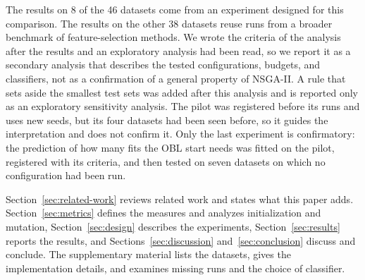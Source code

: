 The results on 8 of the 46 datasets come from an experiment designed for this comparison. The results on the other 38 datasets reuse runs from a broader benchmark of feature-selection methods. We wrote the criteria of the analysis after the results and an exploratory analysis had been read, so we report it as a secondary analysis that describes the tested configurations, budgets, and classifiers, not as a confirmation of a general property of NSGA-II. A rule that sets aside the smallest test sets was added after this analysis and is reported only as an exploratory sensitivity analysis. The pilot was registered before its runs and uses new seeds, but its four datasets had been seen before, so it guides the interpretation and does not confirm it. Only the last experiment is confirmatory: the prediction of how many fits the OBL start needs was fitted on the pilot, registered with its criteria, and then tested on seven datasets on which no configuration had been run.

Section~\ref{sec:related-work} reviews related work and states what this paper adds. Section~\ref{sec:metrics} defines the measures and analyzes initialization and mutation, Section~\ref{sec:design} describes the experiments, Section~\ref{sec:results} reports the results, and Sections~\ref{sec:discussion} and~\ref{sec:conclusion} discuss and conclude. The supplementary material lists the datasets, gives the implementation details, and examines missing runs and the choice of classifier.


